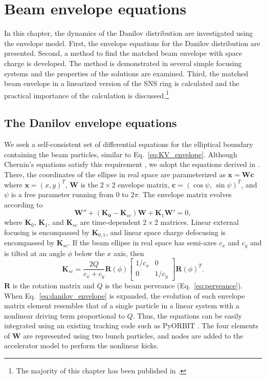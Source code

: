 \chapter{Beam envelope equations} \label{chap-2}

In this chapter, the dynamics of the Danilov distribution are investigated using the envelope model. First, the envelope equations for the Danilov distribution are presented. Second, a method to find the matched beam envelope with space charge is developed. The method is demonstrated in several simple focusing systems and the properties of the solutions are examined. Third, the matched beam envelope in a linearized version of the SNS ring is calculated and the practical importance of the calculation is discussed.\footnote{The majority of this chapter has been published in \cite{Hoover2021}.}


\section{The Danilov envelope equations}

We seek a self-consistent set of differential equations for the elliptical boundary containing the beam particles, similar to Eq.~\eqref{eq:KV_envelope}. Although Chernin's equations satisfy this requirement \cite{Chernin1988}, we adopt the equations derived in \cite{Danilov2003}. There, the coordinates of the ellipse in real space are parameterized as $\mathbf{x} = \mathbf{W}\mathbf{c}$ where $\mathbf{x} = (x, y)^T$, $\mathbf{W}$ is the $2 \times 2$ envelope matrix, $\mathbf{c} = (\cos\psi, \, \sin\psi)^T$, and $\psi$ is a free parameter running from $0$ to $2\pi$. The envelope matrix evolves according to
%
\begin{equation}\label{eq:danilov_envelope}
    \mathbf{W}'' + \left({\mathbf{K_0} - \mathbf{K}_{sc}}\right)\mathbf{W} + \mathbf{K}_1 \mathbf{W}'= 0,
\end{equation}
%
where $\mathbf{K}_0$, $\mathbf{K}_1$, and $\mathbf{K}_{sc}$ are time-dependent $2 \times 2$ matrices. Linear external focusing is encompassed by $\mathbf{K}_{0, 1}$, and linear space charge defocusing is encompassed by $\mathbf{K}_{sc}$. If the beam ellipse in real space has semi-axes $c_x$ and $c_y$ and is tilted at an angle $\phi$ below the $x$ axis, then
%
\begin{equation}
    \mathbf{K}_{sc} = \frac{2Q}{c_x + c_y} 
        \mathbf{R}(\phi) \begin{bmatrix} 1/c_x & 0 \\ 0 & 1/c_y \end{bmatrix} \mathbf{R}(\phi)^T. 
\end{equation}
%
$\mathbf{R}$ is the rotation matrix and $Q$ is the beam perveance (Eq.~\eqref{eq:perveance}). When Eq.~\eqref{eq:danilov_envelope} is expanded, the evolution of each envelope matrix element resembles that of a single particle in a linear system with a nonlinear driving term proportional to $Q$. Thus, the equations can be easily integrated using an existing tracking code such as PyORBIT \cite{Shishlo2015}. The four elements of $\mathbf{W}$ are represented using two bunch particles, and nodes are added to the accelerator model to perform the nonlinear kicks. 

